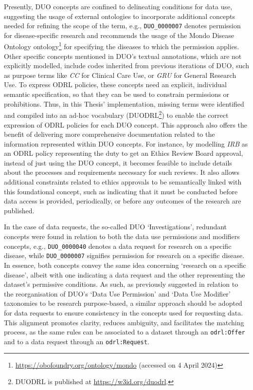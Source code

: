 Presently, DUO concepts are confined to delineating conditions for data use, suggesting the usage of external ontologies to incorporate additional concepts needed for refining the scope of the term, e.g., \texttt{DUO\_0000007} denotes permission for disease-specific research and recommends the usage of the Mondo Disease Ontology ontology\footnote{\url{https://obofoundry.org/ontology/mondo} (accessed on 4 April 2024)} for specifying the diseases to which the permission applies. 
Other specific concepts mentioned in DUO's textual annotations, which are not explicitly modelled, include codes inherited from previous iterations of DUO, such as purpose terms like \textit{CC} for Clinical Care Use, or \textit{GRU} for General Research Use.
To express ODRL policies, these concepts need an explicit, individual semantic specification, so that they can be used to constrain permissions or prohibitions.
Thus, in this Thesis' implementation, missing terms were identified and compiled into an ad-hoc vocabulary (DUODRL\footnote{DUODRL is published at \url{https://w3id.org/duodrl}.}) to enable the correct expression of ODRL policies for each DUO concept.
This approach also offers the benefit of delivering more comprehensive documentation related to the information represented within DUO concepts.
For instance, by modelling \textit{IRB} as an ODRL policy representing the duty to get an Ethics Review Board approval, instead of just using the DUO concept, it becomes feasible to include details about the processes and requirements necessary for such reviews.
It also allows additional constraints related to ethics approvals to be semantically linked with this foundational concept, such as indicating that it must be conducted before data access is provided, periodically, or before any outcomes of the research are published.

In the case of data requests, the so-called DUO `Investigations', redundant concepts were found in relation to both the data use permissions and modifiers concepts, e.g., \texttt{DUO\_0000040} denotes a data request for research on a specific disease, while \texttt{DUO\_0000007} signifies permission for research on a specific disease.
In essence, both concepts convey the same idea concerning `research on a specific disease', albeit with one indicating a data request and the other representing the dataset's permissive conditions.
As such, as previously suggested in relation to the reorganisation of DUO's `Data Use Permission' and `Data Use Modifier' taxonomies to be research purpose-based, a similar approach should be adopted for data requests to ensure consistency in the concepts used for requesting data.
This alignment promotes clarity, reduces ambiguity, and facilitates the matching process, as the same rules can be associated to a dataset through an \texttt{odrl:Offer} and to a data request through an \texttt{odrl:Request}.

